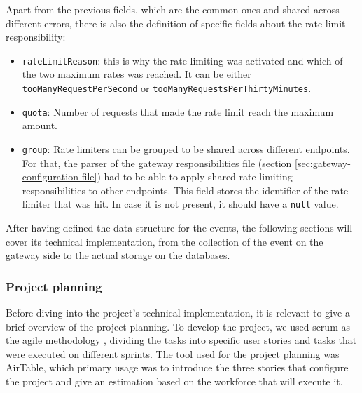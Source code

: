 \documentclass[english, 12pt, a4paper, sci, utf8, a-1b, online]{aaltothesis}
\begin{document}
Apart from the previous fields, which are the common ones and shared across different errors, there is also the definition of specific fields about the rate limit responsibility:

\begin{itemize}
    \item \texttt{rateLimitReason}: this is why the rate-limiting was activated and which of the two maximum rates was reached. It can be either \texttt{tooManyRequestPerSecond} or \texttt{tooManyRequestsPerThirtyMinutes}.
    \item \texttt{quota}: Number of requests that made the rate limit reach the maximum amount.
    \item \texttt{group}: Rate limiters can be grouped to be shared across different endpoints. For that, the parser of the gateway responsibilities file (section \ref{sec:gateway-configuration-file}) had to be able to apply shared rate-limiting responsibilities to other endpoints. This field stores the identifier of the rate limiter that was hit. In case it is not present, it should have a \texttt{null} value.
\end{itemize}

After having defined the data structure for the events, the following sections will cover its technical implementation, from the collection of the event on the gateway side to the actual storage on the databases.

\subsubsection{Project planning}

Before diving into the project's technical implementation, it is relevant to give a brief overview of the project planning. To develop the project, we used scrum as the agile methodology \cite{schwaber1997scrum}, dividing the tasks into specific user stories and tasks that were executed on different sprints. The tool used for the project planning was AirTable, which primary usage was to introduce the three stories that configure the project and give an estimation based on the workforce that will execute it.\\
\end{document}
